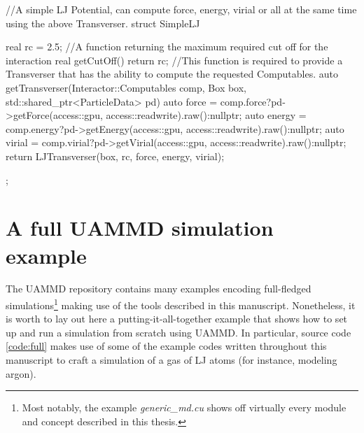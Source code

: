 \documentclass[ twoside,openright,titlepage,numbers=noenddot,%
headinclude,footinclude,cleardoublepage=empty,abstract=on,
BCOR=5mm,paper=b5,fontsize=11pt, dvipsnames
]{scrreprt}
\begin{document}
\begin{code2}
//A simple LJ Potential, can compute force, energy, virial or all at the same time using the above Transverser.
struct SimpleLJ{
  real rc = 2.5;
  //A function returning the maximum required cut off for the interaction
  real getCutOff(){
    return rc;
  }
  //This function is required to provide a Transverser that has the ability to compute the requested Computables.
  auto getTransverser(Interactor::Computables comp,
  Box box,
  std::shared_ptr<ParticleData> pd){
    auto force = comp.force?pd->getForce(access::gpu, access::readwrite).raw():nullptr;
    auto energy = comp.energy?pd->getEnergy(access::gpu, access::readwrite).raw():nullptr;
    auto virial = comp.virial?pd->getVirial(access::gpu, access::readwrite).raw():nullptr;
    return LJTransverser(box, rc, force, energy, virial);
  }
  
};
\end{code2}




\chapter{A full UAMMD simulation example}\label{ch:fullexample}
   
The UAMMD repository contains many examples encoding full-fledged simulations\footnote{Most notably, the example \emph{generic\_md.cu} shows off virtually every module and concept described in this thesis.} making use of the tools described in this manuscript. Nonetheless, it is worth to lay out here a putting-it-all-together example that shows how to set up and run a simulation from scratch using UAMMD. In particular, source code \ref{code:full} makes use of some of the example codes written throughout this manuscript to craft a simulation of a gas of \gls{LJ} atoms (for instance, modeling argon).
\end{document}

